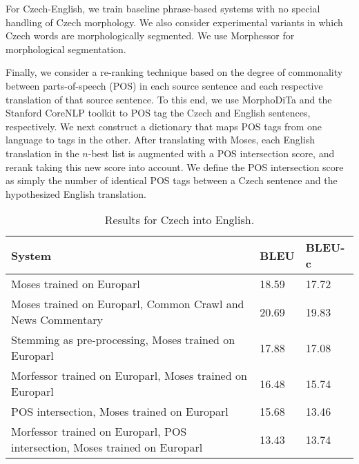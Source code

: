 
For Czech-English, we train baseline phrase-based systems with no special handling of Czech morphology.
%
We also consider experimental variants in which Czech words are morphologically segmented.
%
We use Morphessor \cite{creutz} for morphological segmentation.

Finally, we consider a re-ranking technique based on the degree of commonality between parts-of-speech (POS) in each source sentence and each respective translation of that source sentence.
%
To this end, we use MorphoDiTa \cite{morphodita} and the Stanford CoreNLP toolkit \cite{manning-EtAl:2014:P14-5} to POS tag the Czech and English sentences, respectively.
%
We next construct a dictionary that maps POS tags from one language to tags in the other.
%
After translating with Moses, each English translation in the $n$-best list is augmented with a POS intersection score, and rerank taking this new score into account.
%
We define the POS intersection score as simply the number of identical POS tags between a Czech sentence and the hypothesized English translation.

\begin{table}[!h]
\begin{center}
	\begin{tabular}{| p{4cm} | l | l |}
	\hline
	System & BLEU & BLEU-c \\ \hline
	Moses trained on Europarl & 18.59 & 17.72 \\ \hline
	Moses trained on Europarl, Common Crawl and News Commentary & 20.69 & 19.83 \\ \hline
	Stemming as pre-processing, Moses trained on Europarl & 17.88 & 17.08 \\ \hline
	Morfessor trained on Europarl, Moses trained on Europarl & 16.48 & 15.74 \\ \hline
	POS intersection, Moses trained on Europarl & 15.68 & 13.46 \\ \hline
	Morfessor trained on Europarl, POS intersection, Moses trained on Europarl & 13.43 & 13.74 \\
	\hline
	\end{tabular}
\end{center}
\caption{Results for Czech into English.}
\label{tab:ende}
\end{table}
